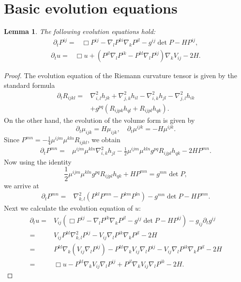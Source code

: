 \documentclass{amsart}
\newtheorem{lemma}[theorem]{Lemma}
\theoremstyle{definition}
\theoremstyle{remark}
\numberwithin{equation}{section}
\begin{document}
\section{Basic evolution equations}
\begin{lemma}\label{ev u}
The following evolution equations hold:
\begin{align}
\partial_tP^{ij}=&\Box P^{ij}-\nabla_lP^{ki}\nabla_kP^{jl}-g^{ij}\det P-HP^{ij},
\end{align}
\begin{align}
\partial_t u=&\Box u+\left(P^{jl}\nabla_lP^{ik}-P^{kl}\nabla_l P^{ij}\right)\nabla_kV_{ij}-2H.
\end{align}
\end{lemma}
\begin{proof}
The evolution equation of the Riemann curvature tensor is given by the standard formula
\begin{align*}
\partial_t R_{ijkl}=&\nabla^2_{i,l}h_{jk}+\nabla^2_{j,k}h_{il}-\nabla^2_{i,k}h_{jl}-\nabla^2_{j,l}h_{ik}\\
&+g^{pq}(R_{ijpk}h_{ql}+R_{ijpl}h_{qk}).
\end{align*}
On the other hand, the evolution of the volume form is given by $$\partial_t\mu_{ijk}=H\mu_{ijk},\quad\partial_t\mu^{ijk}=-H\mu^{ijk}.$$
Since $P^{mn}=-\frac{1}{4}\mu^{ijm}\mu^{kln}R_{ijkl}$, we obtain
\begin{align*}
\partial_tP^{mn}=&\mu^{ijm}\mu^{kln}\nabla^2_{i,k}h_{jl}-\frac{1}{2}\mu^{ijm}\mu^{kln}g^{pq}R_{ijpl}h_{qk}-2HP^{mn}.
\end{align*}
Now using the identity
\[\frac{1}{2}\mu^{ijm}\mu^{kln}g^{pq}R_{ijpl}h_{qk}+HP^{mn}=g^{mn}\det P,\]
we arrive at
\begin{align*}
\partial_tP^{mn}=&\nabla^2_{k,l}(P^{kl}P^{mn}-P^{km}P^{ln})-g^{mn}\det P-HP^{mn}.
\end{align*}
Next we calculate the evolution equation of $u:$
\begin{align*}
\partial_t u=& V_{ij}\left(\Box P^{ij}-\nabla_lP^{ik}\nabla_kP^{jl}-g^{ij}\det P -HP^{ij}\right)- g_{ij}\partial_t g^{ij}\\
=&V_{ij}P^{kl}\nabla^2_{k,l}P^{ij}- V_{ij}\nabla_lP^{ik}\nabla_kP^{jl}-2H\\
=&P^{kl}\nabla_k\left(V_{ij}\nabla_lP^{ij}\right)-P^{kl}\nabla_k V_{ij}\nabla_l P^{ij}-V_{ij}\nabla_lP^{ik}\nabla_kP^{jl}-2H\\
=&\Box u-P^{kl}\nabla_k V_{ij}\nabla_l P^{ij}+P^{jl}\nabla_kV_{ij}\nabla_lP^{ik}-2H.
\end{align*}
\end{proof}
\end{document}
